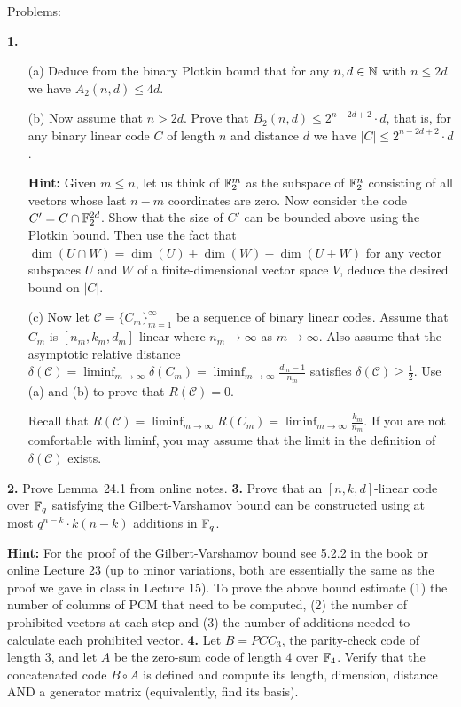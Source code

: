 \documentclass[12pt]{amsart}
\begin{document}
\bf\centerline{Problems: }\rm
\skv
{\bf 1.} 
\begin{itemize}
\item[(a)] Deduce from the binary Plotkin bound that for any $n,d\in{\mathbb N}$ with $n\leq 2d$ we have $A_2(n,d)\leq 4d$.
\item[(b)] Now assume that $n>2d$. Prove that $B_2(n,d)\leq 2^{n-2d+2}\cdot d$, that is, for any binary linear code $C$ of length $n$ and distance $d$ we have $|C|\leq 2^{n-2d+2}\cdot d$. 

{\bf Hint:} Given $m\leq n$, let us think of ${\mathbb F}_2^m$ as the subspace of
${\mathbb F}_2^n$ consisting of all vectors whose last $n-m$ coordinates are zero. Now consider the code $C'=C\cap {\mathbb F}_{2}^{2d}$.
Show that the size of $C'$ can be bounded above using the Plotkin bound. Then use the fact that 
$\dim(U\cap W)=\dim(U)+\dim(W)-\dim(U+W)$ for any vector subspaces $U$ and $W$ of a finite-dimensional vector space $V$,
deduce the desired bound on $|C|$. 
\item[(c)] Now let $\mathcal C=\{C_m\}_{m=1}^{\infty}$ be a sequence of binary linear codes. Assume that 
$C_m$ is $[n_m,k_m,d_m]$-linear where $n_m\to\infty$ as $m\to\infty$. Also assume that the asymptotic relative distance 
$\delta(\mathcal C)=\liminf_{m\to\infty}\delta(C_m)=\liminf_{m\to\infty} \frac{d_m-1}{n_m}$ satisfies
$\delta(\mathcal C)\geq \frac{1}{2}$. Use (a) and (b) to prove that $R(\mathcal C)=0$. 

Recall that $R(\mathcal C)=\liminf_{m\to\infty}R(C_m)=\liminf_{m\to\infty} \frac{k_m}{n_m}$. If you are not comfortable with
liminf, you may assume that the limit in the definition of $\delta(\mathcal C)$ exists.
\end{itemize}
\skv
{\bf 2.} Prove Lemma~24.1 from online notes.
\skv
{\bf 3.} Prove that an $[n,k,d]$-linear code over ${\mathbb F}_q$ satisfying the Gilbert-Varshamov bound can be constructed using at most $q^{n-k}\cdot k(n-k)$ additions in ${\mathbb F}_q$. 
\skv

{\bf Hint:} For the proof of the Gilbert-Varshamov bound see 5.2.2 in the book or online Lecture 23 (up to minor variations, both are essentially the same as the proof we gave in class in Lecture 15). To prove the above bound estimate (1) the number of columns of PCM that need to be computed, (2) the number of prohibited vectors at each step and (3)
the number of additions needed to calculate each prohibited vector. 
\skv
{\bf 4.} Let $B=PCC_3$, the parity-check code of length $3$, and let $A$ be the zero-sum code of length $4$ over ${\mathbb F}_4$. Verify that the concatenated code $B\circ A$ is defined and compute its length, dimension, distance AND a generator matrix (equivalently,
find its basis). 
\skv
\end{document}
